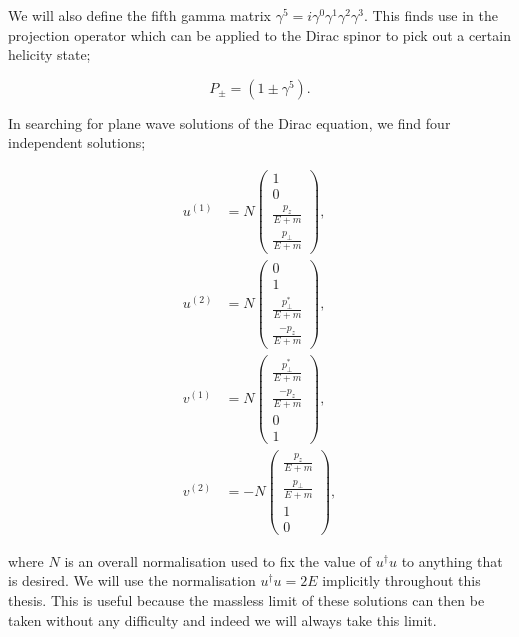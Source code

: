 We will also define the fifth gamma matrix $\gamma^5 = i \gamma^0 \gamma^1 \gamma^2 \gamma^3$. This finds use in the projection operator which can be applied to the Dirac spinor to pick out a certain helicity state; 

\begin{equation}
P_{\pm} = (1 \pm \gamma^5).
\end{equation}

In searching for plane wave solutions of the Dirac equation, we find four independent solutions;

\begin{subequations}
\begin{align}
u^{(1)} &= N
 \begin{pmatrix}
  1 \\
  0 \\
  \frac{p_z}{E+m} \\
  \frac{p_\perp}{E+m} 
 \end{pmatrix},\\
u^{(2)} &= N
 \begin{pmatrix}
  0 \\
  1 \\
  \frac{p_\perp^*}{E+m} \\
  \frac{-p_z}{E+m} 
 \end{pmatrix},\\
v^{(1)} &= N
 \begin{pmatrix}
   \frac{p_\perp^*}{E+m} \\
  \frac{-p_z}{E+m}  \\
 0\\
 1
 \end{pmatrix},\\
v^{(2)} &= -N
 \begin{pmatrix}
  \frac{p_z}{E+m} \\
  \frac{p_\perp}{E+m} \\
  1 \\
  0
 \end{pmatrix},
 \end{align}
 \end{subequations}

where $N$ is an overall normalisation used to fix the value of $u^\dagger u$ to anything that is desired. We will use the normalisation $u^\dagger u = 2E$ implicitly throughout this thesis. This is useful because the massless limit of these solutions can then be taken without any difficulty and indeed we will always take this limit. 

